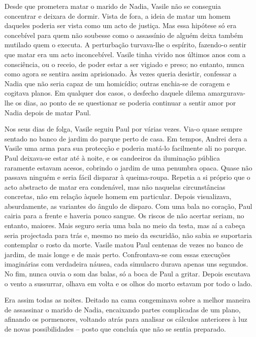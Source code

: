 Desde que prometera matar o marido de Nadia, Vasile não se conseguia
concentrar e deixara de dormir. Vista de fora, a ideia de matar um homem
daqueles poderia ser vista como um acto de justiça. Mas essa hipótese só
era concebível para quem não soubesse como o assassínio de alguém deixa
também mutilado quem o executa. A perturbação turvava-lhe o espírito,
fazendo-o sentir que matar era um acto inconcebível. Vasile tinha vivido
nos últimos anos com a consciência, ou o receio, de poder estar a ser
vigiado e preso; no entanto, nunca como agora se sentira assim
aprisionado. Às vezes queria desistir, confessar a Nadia que não seria
capaz de um homicídio; outras enchia-se de coragem e cogitava planos. Em qualquer dos casos, o desfecho
daquele dilema amargurava-lhe os dias, ao ponto
de se questionar se poderia continuar a sentir amor por Nadia depois de
matar Paul.

Nos seus dias de folga, Vasile seguiu Paul por várias vezes. Via-o quase
sempre sentado no banco de jardim do parque perto de casa. Em tempos,
Andrei dera a Vasile uma arma para sua protecção e poderia matá-lo
facilmente ali no parque. Paul deixava-se estar até à noite, e os
candeeiros da iluminação pública raramente estavam acesos, cobrindo o
jardim de uma penumbra opaca. Quase não passava ninguém e seria fácil
disparar à queima-roupa. Repetia a si próprio que o acto abstracto de
matar era condenável, mas não naquelas circunstâncias concretas, não em
relação àquele homem em particular. Depois visualizava, absurdamente,
as variantes do ângulo de disparo. Com uma bala no coração, Paul cairia
para a frente e haveria pouco sangue. Os riscos de não acertar seriam,
no entanto, maiores. Mais seguro seria uma bala no meio da testa, mas aí
a cabeça seria projectada para trás e, mesmo no meio da escuridão, não
sabia se suportaria contemplar o rosto da morte. Vasile matou Paul
centenas de vezes no banco de jardim, de mais longe e de mais perto.
Confrontava-se com essas execuções imaginárias com verdadeira náusea, cada simulacro durava apenas uns segundos. No fim, nunca ouvia o
som das balas, só a boca de Paul a gritar. Depois escutava o vento a
sussurrar, olhava em volta e os olhos do morto estavam por todo o lado.

Era assim todas as noites. Deitado na cama congeminava sobre a melhor
maneira de assassinar o marido de Nadia, encaixando partes complicadas
de um plano, afinando os pormenores, voltando atrás para analisar os
cálculos anteriores à luz de novas possibilidades -- posto que concluía
que não se sentia preparado.

